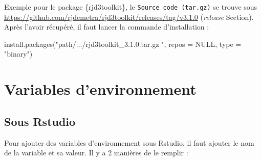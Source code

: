 \documentclass[
]{article}
\newenvironment{Shaded}{\begin{snugshade}}{\end{snugshade}}
\newcommand{\AttributeTok}[1]{\textcolor[rgb]{0.40,0.45,0.13}{#1}}
\newcommand{\ConstantTok}[1]{\textcolor[rgb]{0.56,0.35,0.01}{#1}}
\newcommand{\FunctionTok}[1]{\textcolor[rgb]{0.28,0.35,0.67}{#1}}
\newcommand{\NormalTok}[1]{\textcolor[rgb]{0.00,0.46,0.62}{#1}}
\newcommand{\StringTok}[1]{\textcolor[rgb]{0.13,0.47,0.30}{#1}}
\begin{document}
Exemple pour le package {\{rjd3toolkit\}}, le
\texttt{Source\ code\ (tar.gz)} se trouve sous
\textcolor{html_color}{\url{https://github.com/rjdemetra/rjd3toolkit/releases/tag/v3.1.0}}
(\emph{release} Section). Après l'avoir récupéré, il faut lancer la
commande d'installation :

\begin{Shaded}
\begin{Highlighting}[]
\FunctionTok{install.packages}\NormalTok{(}\StringTok{"path/.../rjd3toolkit\_3.1.0.tar.gz "}\NormalTok{,}
                 \AttributeTok{repos =} \ConstantTok{NULL}\NormalTok{, }\AttributeTok{type =} \StringTok{"binary"}\NormalTok{)}
\end{Highlighting}
\end{Shaded}

\hypertarget{var_env}{%
\section{Variables d'environnement}\label{var_env}}

\hypertarget{sous-rstudio}{%
\subsection{Sous Rstudio}\label{sous-rstudio}}

Pour ajouter des variables d'environnement sous Rstudio, il faut ajouter
le nom de la variable et sa valeur. Il y a 2 manières de le remplir :
\end{document}
